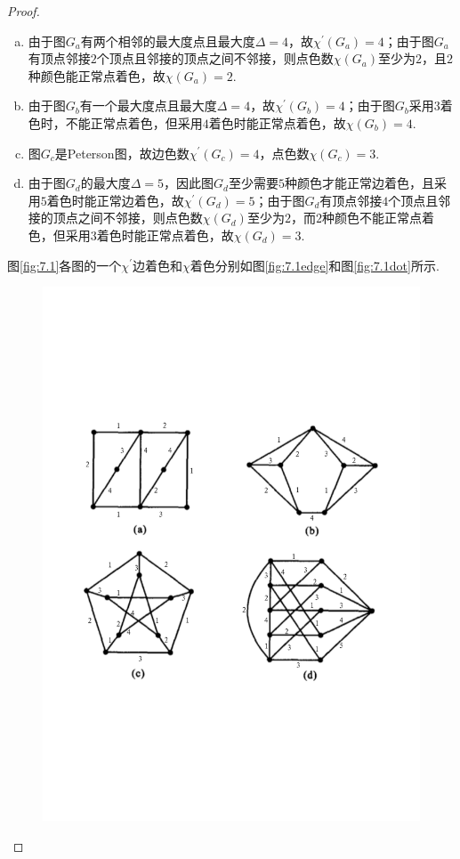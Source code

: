\documentclass[cn,blue,normal,founder,11pt]{elegantnote}
\begin{document}
\begin{proof}
\begin{enumerate}[(a)]
	\item 由于图\(G_a\)有两个相邻的最大度点且最大度\(\Delta=4\)，故\(\chi^{\prime}(G_a)=4\)；由于图\(G_a\)有顶点邻接\(2\)个顶点且邻接的顶点之间不邻接，则点色数\(\chi(G_a)\)至少为\(2\)，且\(2\)种颜色能正常点着色，故\(\chi(G_a)=2\).
	\item 由于图\(G_b\)有一个最大度点且最大度\(\Delta=4\)，故\(\chi^{\prime}(G_b)=4\)；由于图\(G_b\)采用\(3\)着色时，不能正常点着色，但采用\(4\)着色时能正常点着色，故\(\chi(G_b)=4\).
	\item 图\(G_c\)是Peterson图，故边色数\(\chi^{\prime}(G_c)=4\)，点色数\(\chi(G_c)=3\).
	\item 由于图\(G_d\)的最大度\(\Delta=5\)，因此图\(G_d\)至少需要\(5\)种颜色才能正常边着色，且采用\(5\)着色时能正常边着色，故\(\chi^{\prime}(G_d)=5\)；由于图\(G_d\)有顶点邻接\(4\)个顶点且邻接的顶点之间不邻接，则点色数\(\chi(G_d)\)至少为\(2\)，而\(2\)种颜色不能正常点着色，但采用\(3\)着色时能正常点着色，故\(\chi(G_d)=3\).
\end{enumerate}
图\ref{fig:7.1}各图的一个\(\chi^{\prime}\)边着色和\(\chi\)着色分别如图\ref{fig:7.1edge}和图\ref{fig:7.1dot}所示.
\begin{figure}[H]
	\centering
	\includegraphics[scale=0.45]{image/ex7.1edge.pdf}

\end{figure}
\end{proof}
\end{document}
